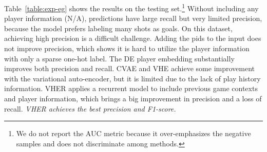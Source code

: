 \documentclass{article}
\begin{document}
Table~\ref{table:exp-eg} shows the results on the testing set.\footnote{We do not report the AUC metric because it over-emphasizes the negative samples and does not discriminate among methods.} %
Without including any player information (N/A), predictions have large recall but very limited precision, because the model prefers labeling many shots as goals. On this dataset, achieving high precision is a difficult challenge. 
Adding the pids to the input does not improve precision, which shows it is hard to utilize the player information with only a sparse one-hot label. 
The DE player embedding substantially improves both precision and recall. 
CVAE and VHE achieve some improvement with the variational auto-encoder, but it is limited due to the lack of play history information.
VHER applies a recurrent model to include previous game contexts and player information, which brings a big improvement in precision and a loss of recall. {\em VHER achieves the best precision and F1-score.}


\end{document}

